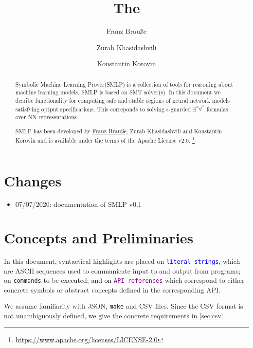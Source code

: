 \documentclass[a4paper,parskip=half]{article} %
\title{The \Solver}
\author{%
	Franz Brauße \and
	Zurab Khasidashvili \and
	Konstantin Korovin
}
\newcommand*\cmdstyle\texttt
\newcommand*\literalColor{blue}
\newcommand*\cmd[1]{\cmdstyle{\textcolor{red!85!black}{#1}}}
\newcommand*\literal[1]{\textcolor{\literalColor}{\cmdstyle{#1}}}
\newcommand*\api[1]{\textcolor{purple}{\cmdstyle{#1}}}
\newcommand*\Solver{Symbolic Machine Learning Prover\xspace}
\newcommand*\SolverAbbrvText{SMLP}
\newcommand*\SolverAbbrv{\SolverAbbrvText\xspace}
\begin{document}
\maketitle
\begin{abstract}


\Solver (\SolverAbbrv) is a collection of tools for reasoning about machine
learning models. \SolverAbbrv is based on SMT solver(s). In this document we
desribe functionality for computing safe and stable regions of neural network
models satisfying optput specifications. This correponds to solving
$\epsilon$-guarded $\exists^*\forall^*$ formulas over NN
representations~\cite{BKK20}.


\SolverAbbrv has been developed by
\href{mailto:brausse@informatik.uni-trier.de?subject=\SolverAbbrvText}{Franz Brauße},
Zurab Khasidashvili
and Konstantin Korovin and is available
under the terms of the Apache License v2.0.%
\footnote{\url{https://www.apache.org/licenses/LICENSE-2.0}}
\end{abstract}
\tableofcontents

\section{Changes}
\begin{itemize}
\item 07/07/2020: documentation of \SolverAbbrv v0.1
\end{itemize}

\section{Concepts and Preliminaries}
In this document, syntactical highlights are placed on
\literal{literal strings}, which are ASCII sequences used to communicate input
to and output from programs; on \cmd{commands} to be executed;
and on \api{API references} which correspond to
either concrete symbols or abstract concepts defined in the corresponding API.

We assume familiarity with JSON, \cmd{make} and CSV files. Since the CSV format
is not unambiguously defined, we give the concrete requirements in
\cref{sec:csv}.
\end{document}
